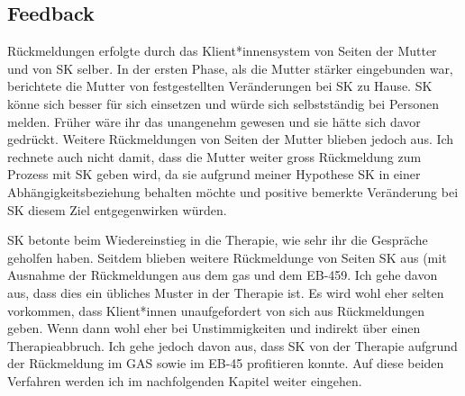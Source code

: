 \subsection{Feedback} 
Rückmeldungen erfolgte durch das Klient*innensystem von Seiten der Mutter und von SK selber. In der ersten Phase, als die Mutter stärker eingebunden war, berichtete die Mutter von festgestellten Veränderungen bei SK zu Hause. SK könne sich besser für sich einsetzen und würde sich selbstständig bei Personen melden. Früher wäre ihr das unangenehm gewesen und sie hätte sich davor gedrückt. Weitere Rückmeldungen von Seiten der Mutter blieben jedoch aus. Ich rechnete auch nicht damit, dass die Mutter weiter gross Rückmeldung zum Prozess mit SK geben wird, da sie aufgrund meiner Hypothese SK in einer Abhängigkeitsbeziehung behalten möchte und positive bemerkte Veränderung bei SK diesem Ziel entgegenwirken würden.

SK betonte beim Wiedereinstieg in die Therapie, wie sehr ihr die Gespräche geholfen haben. Seitdem blieben weitere Rückmeldunge von Seiten SK aus (mit Ausnahme der Rückmeldungen aus dem \ac{gas} und dem EB-459. Ich gehe davon aus, dass dies ein übliches Muster in der Therapie ist. Es wird wohl eher selten vorkommen, dass Klient*innen unaufgefordert von sich aus Rückmeldungen geben. Wenn dann wohl eher bei Unstimmigkeiten und indirekt über einen Therapieabbruch. Ich gehe jedoch davon aus, dass SK von der Therapie aufgrund der Rückmeldung im GAS sowie im EB-45 profitieren konnte. Auf diese beiden Verfahren werden ich im nachfolgenden Kapitel  weiter eingehen.